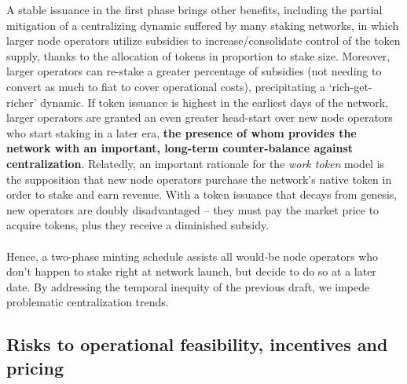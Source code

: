 \documentclass[8pt]{article}
\begin{document}
A stable issuance in the first phase brings other benefits, including the partial mitigation of a centralizing dynamic suffered by many staking networks, in which larger node operators utilize subsidies to increase/consolidate control of the token supply, thanks to the allocation of tokens in proportion to stake size. Moreover, larger operators can re-stake a greater percentage of subsidies (not needing to convert as much to fiat to cover operational costs), precipitating a `rich-get-richer' dynamic. If token issuance is highest in the earliest days of the network, larger operators are granted an even greater head-start over new node operators who start staking in a later era, \textbf{the presence of whom provides the network with an important, long-term counter-balance against centralization}. Relatedly, an important rationale for the \textit{work token} model is the supposition that new node operators purchase the network's native token in order to stake and earn revenue. With a token issuance that decays from genesis, new operators are doubly disadvantaged – they must pay the market price to acquire tokens, plus they receive a diminished subsidy. 
\\\\
Hence, a two-phase minting schedule assists all would-be node operators who don't happen to stake right at network launch, but decide to do so at a later date. By addressing the temporal inequity of the previous draft, we impede problematic centralization trends.

\subsection{Risks to operational feasibility, incentives and pricing}
\end{document}
